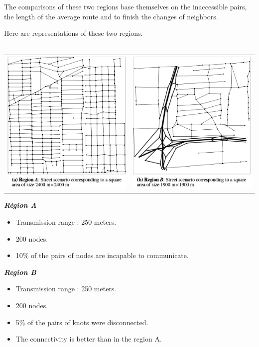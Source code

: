 The comparisons of these two regions base themselves on the inaccessible pairs, the length of the average route and to finish the changes of neighbors.

Here are representations of these two regions.\\\\

\begin{tabular}{cc}
   \includegraphics{../images/cityA.png} &
   \includegraphics{../images/cityB.png} \\
\end{tabular}



\begin{multicols}{2}
\textit{\textbf{Région A}}
\begin{itemize}
\item Transmission range : 250 meters.
\item 200 nodes.
\item 10\% of the pairs of nodes are incapable to communicate.
\end{itemize}
\columnbreak
\textit{\textbf{Region B}}
\begin{itemize}
\item Transmission range : 250 meters.
\item 200 nodes.
\item 5\% of the pairs of knots were disconnected.
\item The connectivity is better than in the region A.
\end{itemize}
\end{multicols}

